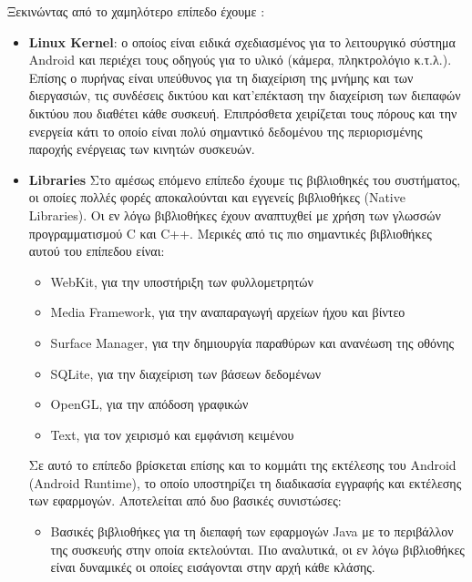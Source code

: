 		 Ξεκινώντας από το χαμηλότερο επίπεδο έχουμε \cite{collinsAndroid}\cite{annuzziAndroid}\cite{androidArchAnalysis}:
		 \begin{itemize}
		 	\item \textbf{Linux Kernel}: ο οποίος είναι ειδικά σχεδιασμένος για το λειτουργικό σύστημα Android και περιέχει τους οδηγούς για το υλικό (κάμερα, πληκτρολόγιο κ.τ.λ.). Επίσης ο πυρήνας είναι υπεύθυνος για τη διαχείριση της μνήμης και των διεργασιών, τις συνδέσεις δικτύου και κατ'επέκταση την διαχείριση των διεπαφών δικτύου που διαθέτει κάθε συσκευή. Επιπρόσθετα χειρίζεται τους πόρους και την ενεργεία κάτι το οποίο είναι πολύ σημαντικό δεδομένου της περιορισμένης παροχής ενέργειας των κινητών συσκευών. 
		 	\item \textbf{Libraries} Στο αμέσως επόμενο επίπεδο έχουμε τις βιβλιοθηκές του συστήματος, οι οποίες πολλές φορές αποκαλούνται και εγγενείς βιβλιοθήκες (Native Libraries). Οι εν λόγω βιβλιοθήκες έχουν αναπτυχθεί με χρήση των γλωσσών προγραμματισμού C και C++. Μερικές από τις πιο σημαντικές βιβλιοθήκες αυτού του επίπεδου είναι:
		 	\begin{itemize}
		 		\item WebKit, για την υποστήριξη των φυλλομετρητών
		 		\item Media Framework, για την αναπαραγωγή αρχείων ήχου και βίντεο
		 		\item Surface Manager, για την δημιουργία παραθύρων και ανανέωση της οθόνης
		 		\item SQLite, για την διαχείριση των βάσεων δεδομένων
		 		\item OpenGL, για την απόδοση γραφικών
		 		\item Text, για τον χειρισμό και εμφάνιση κειμένου
		 	\end{itemize}
		 	Σε αυτό το επίπεδο βρίσκεται επίσης και το κομμάτι της εκτέλεσης του Android (Android Runtime), το οποίο υποστηρίζει τη διαδικασία εγγραφής και εκτέλεσης των εφαρμογών. Αποτελείται από δυο βασικές συνιστώσες:
		 	\begin{itemize}
		 		\item Βασικές βιβλιοθήκες για τη διεπαφή των εφαρμογών Java με το περιβάλλον της συσκευής στην οποία εκτελούνται. Πιο αναλυτικά, οι εν λόγω βιβλιοθήκες είναι δυναμικές οι οποίες εισάγονται στην αρχή κάθε κλάσης.

\end{itemize}
\end{itemize}
